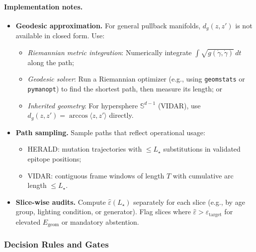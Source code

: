 \documentclass[11pt]{article}
\begin{document}
\paragraph{Implementation notes.}
\begin{itemize}[leftmargin=*]
  \item \textbf{Geodesic approximation.} For general pullback manifolds, $d_g(z,z')$ is not available in closed form. Use:
  \begin{itemize}
    \item \emph{Riemannian metric integration}: Numerically integrate $\int \sqrt{g(\dot\gamma,\dot\gamma)}\,dt$ along the path;
    \item \emph{Geodesic solver}: Run a Riemannian optimizer (e.g., using \texttt{geomstats} or \texttt{pymanopt}) to find the shortest path, then measure its length; or
    \item \emph{Inherited geometry}: For hypersphere $\mathbb{S}^{d-1}$ (VIDAR), use $d_g(z,z') = \arccos\langle z,z'\rangle$ directly.
  \end{itemize}
  
  \item \textbf{Path sampling.} Sample paths that reflect operational usage:
  \begin{itemize}
    \item HERALD: mutation trajectories with $\le L_\star$ substitutions in validated epitope positions;
    \item VIDAR: contiguous frame windows of length $T$ with cumulative arc length $\le L_\star$.
  \end{itemize}
  
  \item \textbf{Slice-wise audits.} Compute $\hat\varepsilon(L_\star)$ separately for each slice (e.g., by age group, lighting condition, or generator). Flag slices where $\hat\varepsilon > \varepsilon_{\text{target}}$ for elevated $E_{\mathrm{geom}}$ or mandatory abstention.
\end{itemize}

\subsubsection{Decision Rules and Gates}
\end{document}
